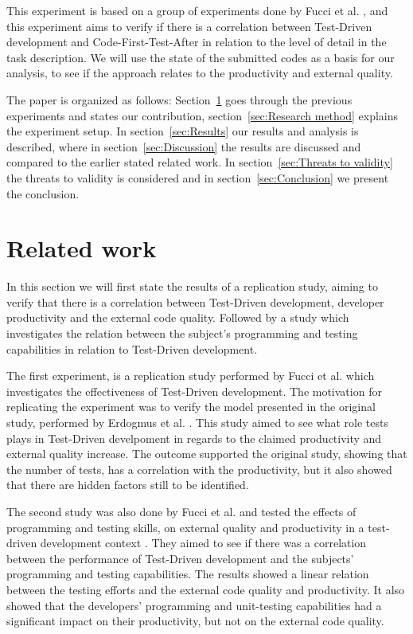 \documentclass{sig-alternate-05-2015}
\begin{document}
This experiment is based on a group of experiments done by Fucci et al. \cite{fucci2}, and this experiment aims to verify if there is a correlation between Test-Driven development and Code-First-Test-After in relation to the level of detail in the task description. We will use the state of the submitted codes as a basis for our analysis, to see if the approach relates to the productivity and external quality.

The paper is organized as follows: Section~\ref{sec:Related work} goes through the previous experiments and states our contribution, section~\ref{sec:Research method} explains the experiment setup. In section~\ref{sec:Results} our results and analysis is described, where in section~\ref{sec:Discussion} the results are discussed and compared to the earlier stated related work. In section~\ref{sec:Threats to validity} the threats to validity is considered and in section~\ref{sec:Conclusion} we present the conclusion. 

\section{Related work}
\label{sec:Related work}
In this section we will first state the results of a replication study, aiming to verify that there is a correlation between Test-Driven development, developer productivity and the external code quality. Followed by a study which investigates the relation between the subject's programming and testing capabilities in relation to Test-Driven development.

The first experiment, is a replication study performed by Fucci et al. \cite{fucci2} which investigates the effectiveness of Test-Driven development. The motivation for replicating the experiment was to verify the model presented in the original study, performed by Erdogmus et al. \cite{erdogmus1}. This study aimed to see what role tests plays in Test-Driven develpoment in regards to the claimed productivity and external quality increase. The outcome supported the original study, showing that the number of tests, has a correlation with the productivity, but it also showed that there are hidden factors still to be identified.

The second study was also done by Fucci et al. and tested the effects of programming and testing skills, on external quality and productivity in a test-driven development context \cite{fucci1}. They aimed to see if there was a correlation between the performance of Test-Driven development and the subjects' programming and testing capabilities. The results showed a linear relation between the testing efforts and the external code quality and productivity. It also showed that the developers' programming and unit-testing capabilities had a significant impact on their productivity, but not on the external code quality.
\end{document}

